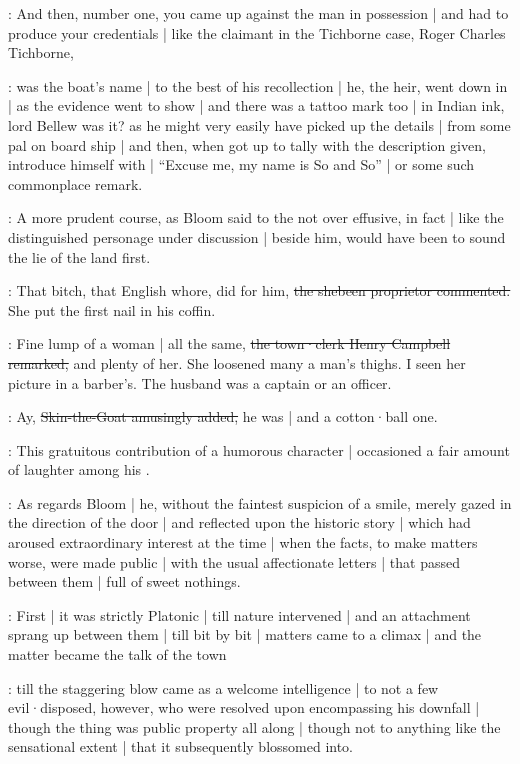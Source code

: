 :
And then,
number one,
you came up against the man in possession |
and had to produce your credentials |
like the claimant in the Tichborne case,
Roger Charles Tichborne,

:
 was the boat's name |
to the best of his recollection |
he,
the heir,
went down in |
as the evidence went to show |
and there was a tattoo mark too |
in Indian ink,
lord Bellew was it?
as he might very easily have picked up the details |
from some pal on board ship |
and then,
when got up to tally with the description given,
introduce himself with |
“Excuse me,
my name is So and So” |
or some such commonplace remark.

:
A more prudent course,
as Bloom said to the not over effusive,%
in fact |
like the distinguished personage under discussion |
beside him,
would have been to sound the lie of the land first.

\SkinTheGoat:
That bitch,
that English whore,
did for him,
\sout{the shebeen proprietor commented.}
She put the first nail in his coffin.

\Campbell:
Fine lump of a woman |
all the same,
\sout{the  town·clerk Henry Campbell remarked,}
and plenty of her.
She loosened many a man's thighs.
I seen her picture in a barber's.
The husband was a captain or an officer.

\SkinTheGoat:
Ay,
\sout{Skin-the-Goat amusingly added,}
he was |
and a cotton·ball one.

:
This gratuitous contribution of a humorous character |
occasioned a fair amount of laughter among his .

:
As regards Bloom |
he,
without the faintest suspicion of a smile,
merely gazed in the direction of the door |
and reflected upon the historic story |
which had aroused extraordinary interest at the time |
when the facts,
to make matters worse,
were made public |
with the usual affectionate letters |
that passed between them |
full of sweet nothings.

:
First |
it was strictly Platonic |
till nature intervened |
and an attachment sprang up between them |
till bit by bit |
matters came to a climax |
and the matter became the talk of the town

:
till the staggering blow came as a welcome intelligence |
to not a few evil·disposed,
however,
who were resolved upon encompassing his downfall |
though the thing was public property all along |
though not to anything like the sensational extent |
that it subsequently blossomed into.%


